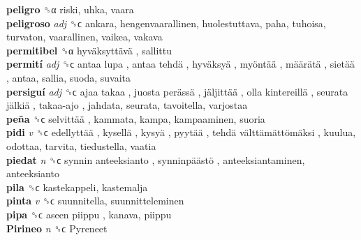\textbf{peligro} ␝α  riski, uhka, vaara  \\
\textbf{peligroso} \emph{adj}  ␝ϲ  ankara, hengenvaarallinen, huolestuttava, paha, tuhoisa, turvaton, vaarallinen, vaikea, vakava  \\
\textbf{permitibel} ␝α   hyväksyttävä , sallittu  \\
\textbf{permití} \emph{adj}  ␝ϲ   antaa lupa ,  antaa tehdä ,  hyväksyä ,  myöntää ,  määrätä ,  sietää , antaa, sallia, suoda, suvaita  \\
\textbf{persiguí} \emph{adj}  ␝ϲ   ajaa takaa ,  juosta perässä ,  jäljittää ,  olla kintereillä ,  seurata jälkiä ,  takaa-ajo , jahdata, seurata, tavoitella, varjostaa  \\
\textbf{peña} ␝ϲ   selvittää , kammata, kampa, kampaaminen, suoria  \\
\textbf{pidi} \emph{v}  ␝ϲ   edellyttää ,  kysellä ,  kysyä ,  pyytää ,  tehdä välttämättömäksi , kuulua, odottaa, tarvita, tiedustella, vaatia  \\
\textbf{piedat} \emph{n}  ␝ϲ   synnin anteeksianto ,  synninpäästö , anteeksiantaminen, anteeksianto  \\
\textbf{pila} ␝ϲ  kastekappeli, kastemalja  \\
\textbf{pinta} \emph{v}  ␝ϲ  suunnitella, suunnitteleminen  \\
\textbf{pipa} ␝ϲ   aseen piippu , kanava, piippu  \\
\textbf{Pirineo} \emph{n}  ␝ϲ   Pyreneet   \\
